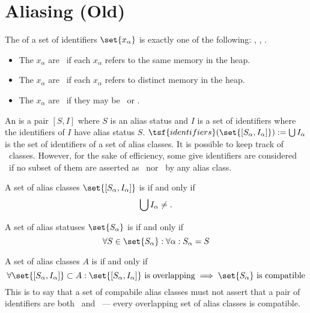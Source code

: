 \newpage
\section{Aliasing (Old)}

The  of a set of identifiers $\set{ x_\alpha }$ is exactly one of the following: \aliases, \nonaliases, .
\begin{itemize}
\item The $x_\alpha$ are \aliases\ if each $x_\alpha$ refers to the same memory in the heap.
\item The $x_\alpha$ are \nonaliases\ if each $x_\alpha$ refers to distinct memory in the heap.
\item The $x_\alpha$ are \unaliases\ if they may be \aliases\ or \nonaliases.
\end{itemize}

\noindent
An  is a pair $[S,I]$ where $S$ is an alias status and $I$ is a set of identifiers where the identifiers of $I$ have alias status $S$.
$\tsf{identifiers}(\set{[S_\alpha, I_\alpha]}) := \bigcup I_\alpha$ is the set of identifiers of a set of alias classes.
It is possible to keep track of \unaliases\ classes. However, for the sake of efficiency, some give identifiers are considered \unaliases\ if no subset of them are asserted as \aliases\ nor \nonaliases\ by any alias class.

\noindent
A set of alias classes $\set{ [S_\alpha, I_\alpha] }$ is  if and only if
$$ \bigcup I_\alpha \neq \empty. $$

\noindent
A set of alias statuses $\set{ S_\alpha }$ is  if and only if
$$ \forall S \in \set{S_\alpha} : \forall \alpha : S_\alpha = S $$

\noindent
A set of alias classes $A$ is  if and only if
$$
\forall \set{ [S_\alpha, I_\alpha] } \subset A :
\set{ [S_\alpha, I_\alpha] } \ \text{is overlapping}
\implies
\set{ S_\alpha } \ \text{is compatible}
$$
This is to say that a set of compabile alias classes must not assert that a pair of identifiers are both \aliases\ and \nonaliases\ --- every overlapping set of alias classes is compatible.

